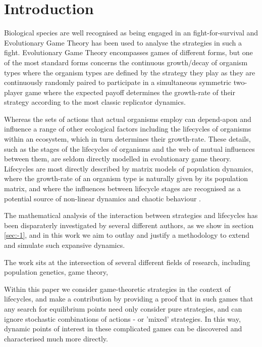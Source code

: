 
\section{Introduction}
Biological species are well recognised as being engaged in an fight-for-survival and Evolutionary Game Theory has been used to analyse the strategies in such a fight.
Evolutionary Game Theory encompasses games of different forms, but one of the most standard forms concerns the continuous growth/decay of organism types where the organism types are defined by the strategy they play as they are continuously randomly paired to participate in a simultaneous symmetric two-player game where the expected payoff determines the growth-rate of their strategy according to the most classic replicator dynamics.\cite{maynard,maynard2,weibull}

Whereas the sets of actions that actual organisms employ can depend-apon and influence a range of other ecological factors including the lifecycles of organisms within an ecosystem, which in turn determines their growth-rate.
These details, such as the stages of the lifecycles of organisms and the web of mutual influences between them, are seldom directly modelled in evolutionary game theory.
Lifecycles are most directly described by matrix models of population dynamics, where the growth-rate of an organism type is naturally given by its population matrix, and where the influences between lifecycle stages are recognised as a potential source of non-linear dynamics and chaotic behaviour \cite{doi:10.1080/10236198.2019.1699916, DEVRIES2020108875, population1}.

The mathematical analysis of the interaction between strategies and lifecycles has been disparaterly investigated by several different authors, as we show in section \ref{sec:-1}, and in this work we aim to outlay and justify a methodology to extend and simulate such expansive dynamics.

The work sits at the intersection of several different fields of research, including population genetics, game theory, 

Within this paper we consider game-theoretic strategies in the context of lifecycles, and make a contribution by providing a proof that in such games that any search for equilibrium points need only consider pure strategies, and can ignore stochastic combinations of actions - or 'mixed' strategies.
In this way, dynamic points of interest in these complicated games can be discovered and characterised much more directly.




